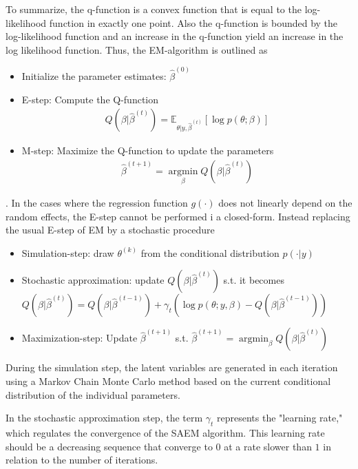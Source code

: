 To summarize, the q-function is a convex function that is equal to the log-likelihood function in exactly one point. Also the q-function is bounded by the log-likelihood function and an increase in the q-function yield an increase in the log likelihood function. Thus, the EM-algorithm is outlined as
\begin{itemize}
    \item Initialize the parameter estimates: $\hat{\beta}^{(0)}$
    \item E-step: Compute the Q-function
    \begin{align*}
        Q(\beta | \hat{\beta}^{(t)}) = \mathbb{E}_{\theta | y, \hat{\beta}^{(t)}} \left[\log p(\theta; \beta) \right]
    \end{align*}
    \item M-step: Maximize the Q-function to update the parameters
    \begin{align*}
        \hat{\beta}^{(t+1)} = \operatorname*{argmin}_\beta Q(\beta | \hat{\beta}^{(t)})
    \end{align*}
\end{itemize} 
\citep{columbia}.
In the cases where the regression function $g(\cdot)$ does not linearly depend on the random effects, the E-step cannot be performed i a closed-form. Instead replacing the usual
E-step of EM by a stochastic procedure

\begin{itemize}
    \item Simulation-step: draw $\theta^{(k)}$ from the conditional distribution $p(\cdot|y)$
    \item Stochastic approximation: update $ Q(\beta | \hat{\beta}^{(t)})$ s.t. it becomes $ Q(\beta | \hat{\beta}^{(t)})= Q(\beta | \hat{\beta}^{(t-1)})+\gamma_t(\log p(\theta; y, \beta)-Q(\beta | \hat{\beta}^{(t-1)}))$
    \item Maximization-step: Update $\hat{\beta}^{(t+1)}$ s.t. $\hat{\beta}^{(t+1)} = \operatorname*{argmin}_\beta Q(\beta | \hat{\beta}^{(t)})$
\end{itemize}
During the simulation step, the latent variables are generated in each iteration using a Markov Chain Monte Carlo method based on the current conditional distribution of the individual parameters. 

In the stochastic approximation step, the term $\gamma_t$ represents the "learning rate," which regulates the convergence of the SAEM algorithm. This learning rate should be a decreasing sequence that converge to $0$ at a rate slower than $1$ in relation to the number of iterations. \citep{Comets2017}



